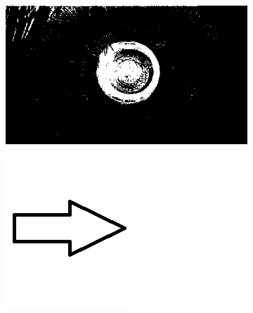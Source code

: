 \documentclass{article}
\begin{document}
\begin{figure}[H]
\centering
\begin{subfigure}{.37\textwidth}
  \centering
  \includegraphics[width=0.97\linewidth]{_Figures/raw_data_1_binary.png}
  \caption{}
  \label{fig:raw_1}
\end{subfigure}%
\begin{subfigure}{.09\textwidth}
  \centering
  \includegraphics[width=0.97\linewidth]{_Figures/leftrightarrow.jpg}
  \label{fig:arrow}
\end{subfigure}%

\end{figure}
\end{document}

